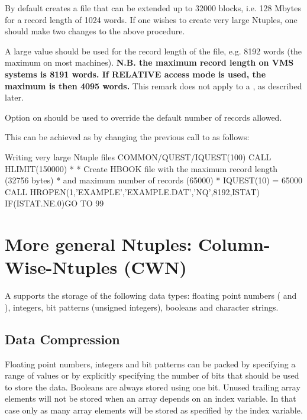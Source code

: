 By default  creates a file that can be extended up to
32000 blocks, i.e. 128 Mbytes for a record length 
of 1024 words.
If one wishes to create very large Ntuples, one should
make two changes to the above procedure.

\begin{UL}
\item A large value should be used for the record length of the file,
      e.g. 8192 words (the maximum on most machines).
      {\bf N.B. the maximum record length on VMS systems is 8191 words.
      If RELATIVE access mode is used, the maximum is then 4095 words.}
      This remark does not apply to a \CWN, as described later.
\item Option  on  should be used to override the default
      number of records allowed. 
\end{UL}

This can be achieved as by changing the previous call to 
as follows:

\begin{XMPt}{Writing very large Ntuple files}
              COMMON/QUEST/IQUEST(100)
              CALL HLIMIT(150000)
*
*     Create HBOOK file with the maximum record length (32756 bytes)
*     and maximum number of records (65000)
*
              IQUEST(10) = 65000
              CALL HROPEN(1,'EXAMPLE','EXAMPLE.DAT','NQ',8192,ISTAT)
              IF(ISTAT.NE.0)GO TO 99
\end{XMPt}

\newpage%

\section{More general Ntuples: Column-Wise-Ntuples (CWN)}
\label{sec:NtupleCWN}

A \CWN{} supports the storage of the following data types: floating
point numbers ( and ), integers, bit patterns
(unsigned integers), booleans and character strings.

\subsection*{Data Compression}

Floating point numbers, integers and bit patterns can be packed by
specifying a range of values or by explicitly specifying the number
of bits that should be used to store the data. Booleans are always
stored using one bit. Unused trailing array elements will not be
stored when an array depends on an index variable. In that case only
as many array elements will be stored as specified by the index
variable.

